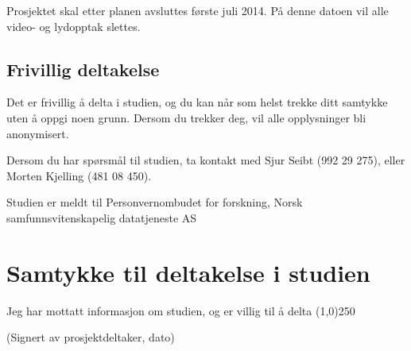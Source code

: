 \documentclass[a4paper,norsk,12pt]{article} %
\begin{document}
Prosjektet skal etter planen avsluttes første juli 2014. På denne datoen vil alle video- og lydopptak slettes. 

\subsection*{Frivillig deltakelse}
Det er frivillig å delta i studien, og du kan når som helst trekke ditt samtykke uten å oppgi noen grunn. Dersom du trekker deg, vil alle opplysninger bli anonymisert. 

Dersom du har spørsmål til studien, ta kontakt med Sjur Seibt (992 29 275), eller Morten Kjelling (481 08 450). 

Studien er meldt til Personvernombudet for forskning, Norsk samfunnsvitenskapelig datatjeneste AS

\section*{Samtykke til deltakelse i studien}
Jeg har mottatt informasjon om studien, og er villig til å delta
\newline\newline\newline\newline
\line(1,0){250}

(Signert av prosjektdeltaker, dato)
\end{document}
